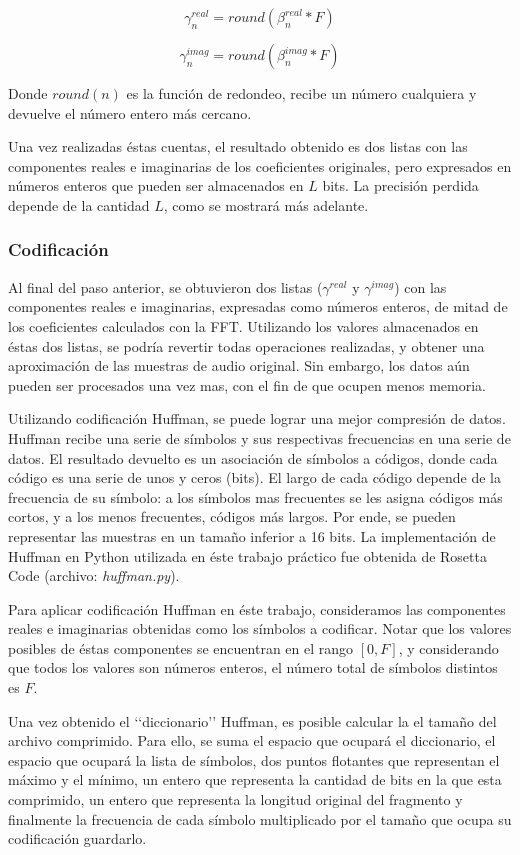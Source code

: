 \documentclass[12pt,a4paper]{article}
\begin{document}
$$ \gamma^{real}_n = round(\beta^{real}_n * F) $$

$$ \gamma^{imag}_n = round(\beta^{imag}_n * F) $$

  Donde $round(n)$ es la función de redondeo, recibe un número cualquiera y devuelve el número entero más cercano.

  Una vez realizadas éstas cuentas, el resultado obtenido es dos listas con las componentes reales e imaginarias de los coeficientes originales, pero expresados en números enteros que pueden ser almacenados en $L$ bits.  La precisión perdida depende de la cantidad $L$, como se mostrará más adelante.

\subsubsection{Codificación}

  Al final del paso anterior, se obtuvieron dos listas ($\gamma^{real}$ y $\gamma^{imag}$) con las componentes reales e imaginarias, expresadas como números enteros, de mitad de los coeficientes calculados con la FFT.  Utilizando los valores almacenados en éstas dos listas, se podría revertir todas operaciones realizadas, y obtener una aproximación de las muestras de audio original.  Sin embargo, los datos aún pueden ser procesados una vez mas, con el fin de que ocupen menos memoria.

  Utilizando codificación Huffman, se puede lograr una mejor compresión de datos.  Huffman recibe una serie de símbolos y sus respectivas frecuencias en una serie de datos.  El resultado devuelto es un asociación de símbolos a códigos, donde cada código es una serie de unos y ceros (bits).  El largo de cada código depende de la frecuencia de su símbolo: a los símbolos mas frecuentes se les asigna códigos más cortos, y a los menos frecuentes, códigos más largos. Por ende, se pueden representar las muestras en un tamaño inferior a 16 bits.  La implementación de Huffman en Python utilizada en éste trabajo práctico fue obtenida de Rosetta Code \cite{rosetta} (archivo: \emph{huffman.py}).

  Para aplicar codificación Huffman en éste trabajo, consideramos las componentes reales e imaginarias obtenidas como los símbolos a codificar.  Notar que los valores posibles de éstas componentes se encuentran en el rango $[0, F]$, y considerando que todos los valores son números enteros, el número total de símbolos distintos es $F$.

  Una vez obtenido el ‘‘diccionario’’ Huffman, es posible calcular la el tamaño del archivo comprimido. Para ello, se suma el espacio que ocupará el diccionario, el espacio que ocupará la lista de símbolos, dos puntos flotantes que representan el máximo y el mínimo, un entero que representa la cantidad de bits en la que esta comprimido, un entero que representa la longitud original del fragmento y finalmente la frecuencia de cada símbolo multiplicado por el tamaño que ocupa su codificación guardarlo. 
  
\end{document}
